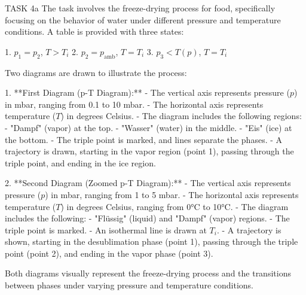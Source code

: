 TASK 4a  
The task involves the freeze-drying process for food, specifically focusing on the behavior of water under different pressure and temperature conditions. A table is provided with three states:

1. \( p_1 = p_2 \), \( T > T_i \)  
2. \( p_2 = p_{\text{amb}} \), \( T = T_i \)  
3. \( p_3 < T(p) \), \( T = T_i \)  

Two diagrams are drawn to illustrate the process:

1. **First Diagram (p-T Diagram):**  
   - The vertical axis represents pressure (\( p \)) in mbar, ranging from 0.1 to 10 mbar.  
   - The horizontal axis represents temperature (\( T \)) in degrees Celsius.  
   - The diagram includes the following regions:  
     - "Dampf" (vapor) at the top.  
     - "Wasser" (water) in the middle.  
     - "Eis" (ice) at the bottom.  
   - The triple point is marked, and lines separate the phases.  
   - A trajectory is drawn, starting in the vapor region (point 1), passing through the triple point, and ending in the ice region.  

2. **Second Diagram (Zoomed p-T Diagram):**  
   - The vertical axis represents pressure (\( p \)) in mbar, ranging from 1 to 5 mbar.  
   - The horizontal axis represents temperature (\( T \)) in degrees Celsius, ranging from 0°C to 10°C.  
   - The diagram includes the following:  
     - "Flüssig" (liquid) and "Dampf" (vapor) regions.  
     - The triple point is marked.  
     - An isothermal line is drawn at \( T_i \).  
     - A trajectory is shown, starting in the desublimation phase (point 1), passing through the triple point (point 2), and ending in the vapor phase (point 3).  

Both diagrams visually represent the freeze-drying process and the transitions between phases under varying pressure and temperature conditions.